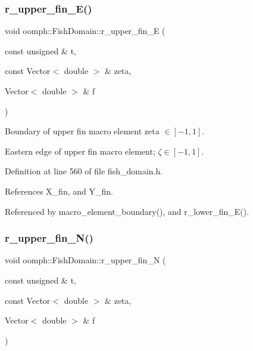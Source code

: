 \subsubsection{\texorpdfstring{r\+\_\+upper\+\_\+fin\+\_\+\+E()}{r\_upper\_fin\_E()}}
{\footnotesize\ttfamily void oomph\+::\+Fish\+Domain\+::r\+\_\+upper\+\_\+fin\+\_\+E (\begin{DoxyParamCaption}\item[{const unsigned \&}]{t,  }\item[{const Vector$<$ double $>$ \&}]{zeta,  }\item[{Vector$<$ double $>$ \&}]{f }\end{DoxyParamCaption})\hspace{0.3cm}{\ttfamily [private]}}



Boundary of upper fin macro element zeta $ \in [-1,1] $. 

Eastern edge of upper fin macro element; $ \zeta \in [-1,1] $. 

Definition at line 560 of file fish\+\_\+domain.\+h.



References X\+\_\+fin, and Y\+\_\+fin.



Referenced by macro\+\_\+element\+\_\+boundary(), and r\+\_\+lower\+\_\+fin\+\_\+\+E().

\mbox{\label{classoomph_1_1FishDomain_a6b0cc31071869ef0e4b4794fe5a46d2f}} 
\subsubsection{\texorpdfstring{r\+\_\+upper\+\_\+fin\+\_\+\+N()}{r\_upper\_fin\_N()}}
{\footnotesize\ttfamily void oomph\+::\+Fish\+Domain\+::r\+\_\+upper\+\_\+fin\+\_\+N (\begin{DoxyParamCaption}\item[{const unsigned \&}]{t,  }\item[{const Vector$<$ double $>$ \&}]{zeta,  }\item[{Vector$<$ double $>$ \&}]{f }\end{DoxyParamCaption})\hspace{0.3cm}{\ttfamily [private]}}



